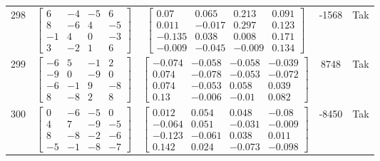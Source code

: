 \documentclass[a4paper,12pt]{article}
\begin{document}
\begin{tabular}{c c c c c}
298
&
$\begin{bmatrix} 6 & -4 & -5 & 6 \\ 8 & -6 & 4 & -5 \\ -1 & 4 & 0 & -3 \\ 3 & -2 & 1 & 6 \end{bmatrix}$
&
$\begin{bmatrix} 0.07 & 0.065 & 0.213 & 0.091 \\ 0.011 & -0.017 & 0.297 & 0.123 \\ -0.135 & 0.038 & 0.008 & 0.171 \\ -0.009 & -0.045 & -0.009 & 0.134 \end{bmatrix}$
&
-1568
&
Tak
\\
299
&
$\begin{bmatrix} -6 & 5 & -1 & 2 \\ -9 & 0 & -9 & 0 \\ -6 & -1 & 9 & -8 \\ 8 & -8 & 2 & 8 \end{bmatrix}$
&
$\begin{bmatrix} -0.074 & -0.058 & -0.058 & -0.039 \\ 0.074 & -0.078 & -0.053 & -0.072 \\ 0.074 & -0.053 & 0.058 & 0.039 \\ 0.13 & -0.006 & -0.01 & 0.082 \end{bmatrix}$
&
8748
&
Tak
\\
300
&
$\begin{bmatrix} 0 & -6 & -5 & 0 \\ 4 & 7 & -9 & -5 \\ 8 & -8 & -2 & -6 \\ -5 & -1 & -8 & -7 \end{bmatrix}$
&
$\begin{bmatrix} 0.012 & 0.054 & 0.048 & -0.08 \\ -0.064 & 0.051 & -0.031 & -0.009 \\ -0.123 & -0.061 & 0.038 & 0.011 \\ 0.142 & 0.024 & -0.073 & -0.098 \end{bmatrix}$
&
-8450
&
Tak
\\
\end{tabular} \egroup \newpage
\end{document}
